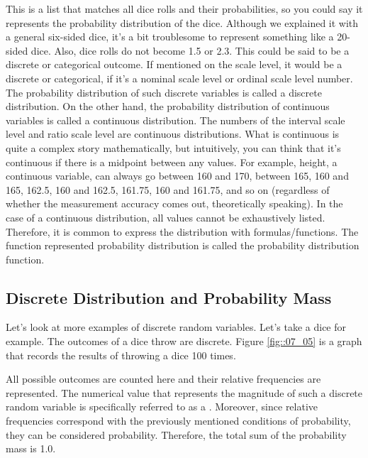 \documentclass{ltjbook}
\begin{document}
This is a list that matches all dice rolls and their probabilities, so you could say it represents the probability distribution of the dice. Although we explained it with a general six-sided dice, it's a bit troublesome to represent something like a 20-sided dice. Also, dice rolls do not become 1.5 or 2.3. This could be said to be a discrete or categorical outcome. If mentioned on the scale level, it would be a discrete or categorical, if it's a nominal scale level or ordinal scale level number. The probability distribution of such discrete variables is called a discrete distribution. On the other hand, the probability distribution of continuous variables is called a continuous distribution. The numbers of the interval scale level and ratio scale level are continuous distributions. What is continuous is quite a complex story mathematically, but intuitively, you can think that it's continuous if there is a midpoint between any values. For example, height, a continuous variable, can always go between 160 and 170, between 165, 160 and 165, 162.5, 160 and 162.5, 161.75, 160 and 161.75, and so on (regardless of whether the measurement accuracy comes out, theoretically speaking). In the case of a continuous distribution, all values cannot be exhaustively listed. Therefore, it is common to express the distribution with formulas/functions. The function represented probability distribution is called the probability distribution function.

\subsection{Discrete Distribution and Probability Mass}
Let's look at more examples of discrete random variables. Let's take a dice for example. The outcomes of a dice throw are discrete. Figure \ref{fig::07_05} is a graph that records the results of throwing a dice 100 times.


All possible outcomes are counted here and their relative frequencies are represented. The numerical value that represents the magnitude of such a discrete random variable is specifically referred to as a . Moreover, since relative frequencies correspond with the previously mentioned conditions of probability, they can be considered probability. Therefore, the total sum of the probability mass is 1.0.
\end{document}
